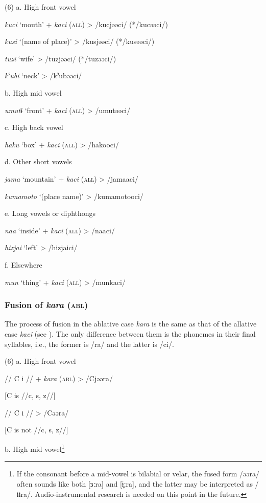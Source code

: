 (6)  a.  High front vowel  

    \textit{kuci}  ‘mouth’  +  \textit{kaci} (\textsc{all})  >  /kucjəəci/  (*/kucəəci/)

    \textit{kusi}  ‘(name of place)’      >  /kusjəəci/  (*/kusəəci/)

    \textit{tuzi}  ‘wife’      >  /tuzjəəci/  (*/tuzəəci/)

    \textit{kˀubi}  ‘neck’      >  /kˀubəəci/  

  b.  High mid vowel

    \textit{umutɨ}  ‘front’  +  \textit{kaci} (\textsc{all})  >  /umutəəci/

  c.  High back vowel  

    \textit{haku}  ‘box’  +  \textit{kaci} (\textsc{all})  >  /hakooci/

  d.  Other short vowels

    \textit{jama}  ‘mountain’  +  \textit{kaci} (\textsc{all})  >  /jamaaci/

    \textit{kumamoto}  ‘(place name)’      >  /kumamotooci/  

  e.  Long vowels or diphthongs  

    \textit{naa}  ‘inside’  +  \textit{kaci} (\textsc{all})  >  /naaci/

    \textit{hizjai}  ‘left’      >  /hizjaici/  

  f.  Elsewhere

    \textit{mun}  ‘thing’  +  \textit{kaci} (\textsc{all})  >  /munkaci/

\subsubsection{Fusion of \textit{kara} (\textsc{abl})}
\label{bkm:Ref365151812}
The process of fusion in the ablative case \textit{kara} is the same as that of the allative case \textit{kaci} (see ). The only difference between them is the phonemes in their final syllables, i.e., the former is /ra/ and the latter is /ci/.

(6)  a.  High front vowel

    //  C  i  //  +  \textit{kara} (\textsc{abl})  >  /Cjəəra/

    [C is //c, s, z//]

    //  C  i  //      >  /Cəəra/

    [C is not //c, s, z//]

  b.  High mid vowel\footnote{If the consonant before a mid-vowel is bilabial or velar, the fused form /əəra/ often sounds like both [ɜːra] and [ɨ̞ːra], and the latter may be interpreted as /ɨɨra/. Audio-instrumental research is needed on this point in the future.}

